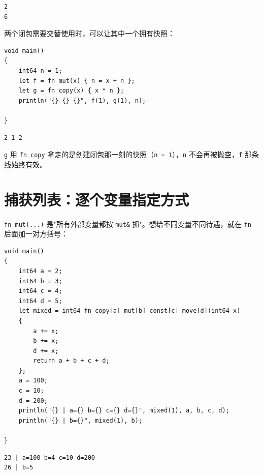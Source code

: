 \par
\medskip
\begin{lstlisting}[style=out]
2
6
\end{lstlisting}
\par
\medskip

两个闭包需要交替使用时，可以让其中一个拥有快照：

\par
\medskip
\begin{lstlisting}[style=chali]
void main()
{
    int64 n = 1;
    let f = fn mut(x) { n = x + n };
    let g = fn copy(x) { x * n };
    println("{} {} {}", f(1), g(1), n);

}
\end{lstlisting}
\par
\medskip

\par
\medskip
\begin{lstlisting}[style=out]
2 1 2
\end{lstlisting}
\par
\medskip

\texttt{g} 用 \texttt{fn copy} 拿走的是创建闭包那一刻的快照（\texttt{n =\allowbreak{} 1}），\texttt{n} 不会再被搬空，\texttt{f} 那条线始终有效。

\section{捕获列表：逐个变量指定方式}

\texttt{fn mut(\allowbreak{}.\allowbreak{}.\allowbreak{}.\allowbreak{})\allowbreak{}} 是"所有外部变量都按 \texttt{mut\&} 抓"。想给不同变量不同待遇，就在 \texttt{fn} 后面加一对方括号：

\par
\medskip
\begin{lstlisting}[style=chali]
void main()
{
    int64 a = 2;
    int64 b = 3;
    int64 c = 4;
    int64 d = 5;
    let mixed = int64 fn copy[a] mut[b] const[c] move[d](int64 x)
    {
        a += x;
        b += x;
        d += x;
        return a + b + c + d;
    };
    a = 100;
    c = 10;
    d = 200;
    println("{} | a={} b={} c={} d={}", mixed(1), a, b, c, d);
    println("{} | b={}", mixed(1), b);

}
\end{lstlisting}
\par
\medskip

\par
\medskip
\begin{lstlisting}[style=out]
23 | a=100 b=4 c=10 d=200
26 | b=5
\end{lstlisting}
\par
\medskip

